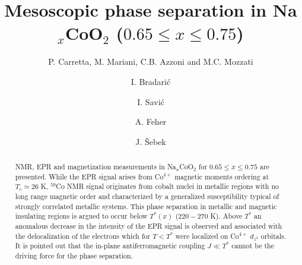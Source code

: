 \documentclass[prb,showpacs,preprintnumbers,amsmath,amssymb,floatfix]{revtex4}
\begin{document}
\draft


\newcommand{\cu} {$^{63}$Cu }
\newcommand{\cuiso} {$^{63,65}$Cu }
\newcommand{\etal} {{\it et al.} }
\newcommand{\ie} {{\it i.e.} }
\newcommand{\aucr}{CeCu$_{5.9}$Au$_{0.1}$ }
\newcommand{\auaf}{CeCu$_{5.2}$Au$_{0.8}$ }
\newcommand{\aux}{CeCu$_{6-x}$Au$_{x}$ }
\newcommand{\ip}{${\cal A}^2$ }





\title{Mesoscopic phase separation in Na$_x$CoO$_2$ ($0.65\leq x\leq 0.75$)}



\author{P. Carretta, M. Mariani, C.B. Azzoni and M.C. Mozzati}
\author{I. Bradari\'c}
\author{I. Savi\'c}
\author{A. Feher }
\author{J. \v{S}ebek}
\widetext



\begin{abstract}

NMR, EPR and magnetization measurements in Na$_x$CoO$_2$ for
$0.65\leq x\leq 0.75$ are presented. While the EPR signal arises
from Co$^{4+}$ magnetic moments ordering at $T_c\simeq 26$ K,
$^{59}$Co NMR signal originates from cobalt nuclei in metallic
regions with no long range magnetic order and characterized by a
generalized susceptibility typical of strongly correlated metallic
systems. This phase separation in metallic and magnetic insulating
regions is argued to occur below $T^*(x)$ ($220 - 270$ K). Above
$T^*$ an anomalous decrease in the intensity of the EPR signal is
observed and associated with the delocalization of the electrons
which for $T<T^*$ were localized on Co$^{4+}$ $d_{z^2}$ orbitals.
It is pointed out that the in-plane antiferromagnetic coupling
$J\ll T^*$ cannot be the driving force for the phase separation.



\end{abstract}
\end{document}
